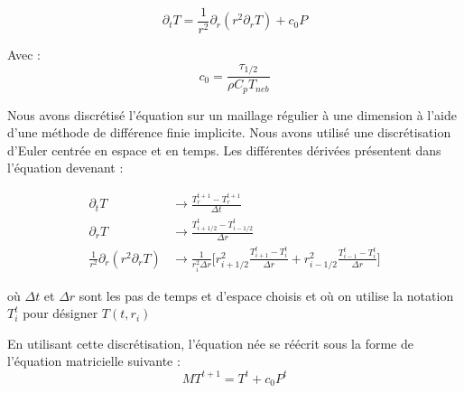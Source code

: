 \documentclass[10pt,a4paper]{article}
\numberwithin{equation}{section}
\begin{document}
\begin{equation}
 \partial_{t} T =  \frac{1}{r^2} \partial_{r} ( {r}^2 \partial_{r} T)  + c_0 P 
\end{equation}

Avec :
\begin{equation}
 c_0 = \frac{\tau_{1/2}}{\rho C_p T_{neb}}
\end{equation}


Nous avons discrétisé l'équation sur un maillage régulier à une dimension à l'aide d'une méthode de différence finie implicite. Nous avons utilisé une discrétisation d'Euler centrée en espace et en temps. Les différentes dérivées présentent dans l'équation devenant :

\begin{align}
\partial_t T &\rightarrow  \frac{T^{t+1}_r - T^{t+1}_r}{\Delta t}\\
\partial_r T &\rightarrow  \frac{T^t_{i+1/2} - T^{t}_{i-1/2}}{\Delta r} \\
\frac{1}{r^2}\partial_r (r^2 \partial_r T ) &\rightarrow \frac{1}{r^2_i \Delta r}\Big [ r^2_{i+1/2}\frac{T^t_{i+1} - T^{t}_{i}}{\Delta r} + r^2_{i-1/2}\frac{T^t_{i-1} - T^{t}_{i}}{\Delta r} \Big]
\end{align}

où $\Delta t$ et $\Delta r$ sont les pas de temps et d'espace choisis et où on utilise la notation $T^{t}_i$ pour désigner $T(t,r_i)$ 

En utilisant cette discrétisation, l'équation née se réécrit sous la forme de l'équation matricielle suivante :
\begin{equation}
MT^{t+1} = T^t + c_0 P^{t}
\end{equation}
\end{document}
